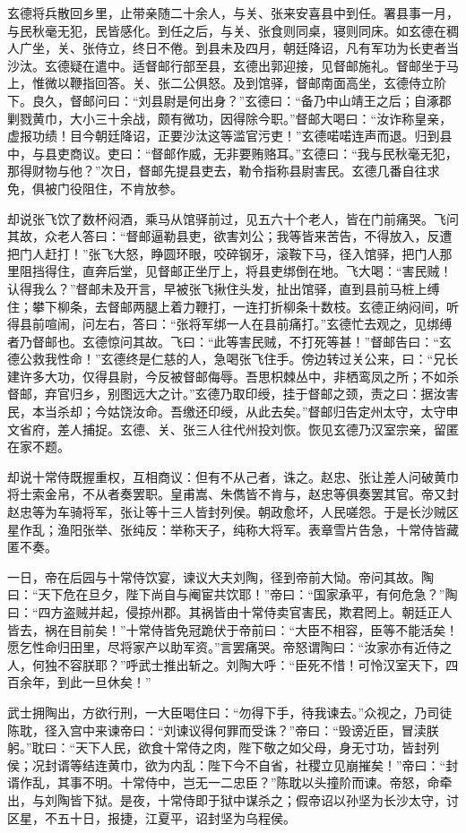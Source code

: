 \documentclass[a4paper]{article}
\begin{document}
玄德将兵散回乡里，止带亲随二十余人，与关、张来安喜县中到任。署县事一月，与民秋毫无犯，民皆感化。到任之后，与关、张食则同桌，寝则同床。如玄德在稠人广坐，关、张侍立，终日不倦。到县未及四月，朝廷降诏，凡有军功为长吏者当沙汰。玄德疑在遣中。适督邮行部至县，玄德出郭迎接，见督邮施礼。督邮坐于马上，惟微以鞭指回答。关、张二公俱怒。及到馆驿，督邮南面高坐，玄德侍立阶下。良久，督邮问曰：“刘县尉是何出身？”玄德曰：“备乃中山靖王之后；自涿郡剿戮黄巾，大小三十余战，颇有微功，因得除今职。”督邮大喝曰：“汝诈称皇亲，虚报功绩！目今朝廷降诏，正要沙汰这等滥官污吏！”玄德喏喏连声而退。归到县中，与县吏商议。吏曰：“督邮作威，无非要贿赂耳。”玄德曰：“我与民秋毫无犯，那得财物与他？”次日，督邮先提县吏去，勒令指称县尉害民。玄德几番自往求免，俱被门役阻住，不肯放参。

却说张飞饮了数杯闷酒，乘马从馆驿前过，见五六十个老人，皆在门前痛哭。飞问其故，众老人答曰：“督邮逼勒县吏，欲害刘公；我等皆来苦告，不得放入，反遭把门人赶打！”张飞大怒，睁圆环眼，咬碎钢牙，滚鞍下马，径入馆驿，把门人那里阻挡得住，直奔后堂，见督邮正坐厅上，将县吏绑倒在地。飞大喝：“害民贼！认得我么？”督邮未及开言，早被张飞揪住头发，扯出馆驿，直到县前马桩上缚住；攀下柳条，去督邮两腿上着力鞭打，一连打折柳条十数枝。玄德正纳闷间，听得县前喧闹，问左右，答曰：“张将军绑一人在县前痛打。”玄德忙去观之，见绑缚者乃督邮也。玄德惊问其故。飞曰：“此等害民贼，不打死等甚！”督邮告曰：“玄德公救我性命！”玄德终是仁慈的人，急喝张飞住手。傍边转过关公来，曰：“兄长建许多大功，仅得县尉，今反被督邮侮辱。吾思枳棘丛中，非栖鸾凤之所；不如杀督邮，弃官归乡，别图远大之计。”玄德乃取印绶，挂于督邮之颈，责之曰：据汝害民，本当杀却；今姑饶汝命。吾缴还印绶，从此去矣。”督邮归告定州太守，太守申文省府，差人捕捉。玄德、关、张三人往代州投刘恢。恢见玄德乃汉室宗亲，留匿在家不题。

却说十常侍既握重权，互相商议：但有不从己者，诛之。赵忠、张让差人问破黄巾将士索金帛，不从者奏罢职。皇甫嵩、朱儁皆不肯与，赵忠等俱奏罢其官。帝又封赵忠等为车骑将军，张让等十三人皆封列侯。朝政愈坏，人民嗟怨。于是长沙贼区星作乱；渔阳张举、张纯反：举称天子，纯称大将军。表章雪片告急，十常侍皆藏匿不奏。

一日，帝在后园与十常侍饮宴，谏议大夫刘陶，径到帝前大恸。帝问其故。陶曰：“天下危在旦夕，陛下尚自与阉宦共饮耶！”帝曰：“国家承平，有何危急？”陶曰：“四方盗贼并起，侵掠州郡。其祸皆由十常侍卖官害民，欺君罔上。朝廷正人皆去，祸在目前矣！”十常侍皆免冠跪伏于帝前曰：“大臣不相容，臣等不能活矣！愿乞性命归田里，尽将家产以助军资。”言罢痛哭。帝怒谓陶曰：“汝家亦有近侍之人，何独不容朕耶？”呼武士推出斩之。刘陶大呼：“臣死不惜！可怜汉室天下，四百余年，到此一旦休矣！”

武士拥陶出，方欲行刑，一大臣喝住曰：“勿得下手，待我谏去。”众视之，乃司徒陈耽，径入宫中来谏帝曰：“刘谏议得何罪而受诛？”帝曰：“毁谤近臣，冒渎朕躬。”耽曰：“天下人民，欲食十常侍之肉，陛下敬之如父母，身无寸功，皆封列侯；况封谞等结连黄巾，欲为内乱：陛下今不自省，社稷立见崩摧矣！”帝曰：“封谞作乱，其事不明。十常侍中，岂无一二忠臣？”陈耽以头撞阶而谏。帝怒，命牵出，与刘陶皆下狱。是夜，十常侍即于狱中谋杀之；假帝诏以孙坚为长沙太守，讨区星，不五十日，报捷，江夏平，诏封坚为乌程侯。
\end{document}
